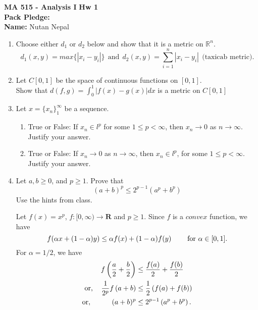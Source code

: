 \documentclass[12pt]{article}
\newcommand{\ds}{\displaystyle}
\begin{document}
{\large \textbf{MA 515 - Analysis I}}\hfill
\textbf{Hw 1} \\
{\bf Pack Pledge:} \\
{\bf Name:} Nutan Nepal\hfill \\
 \underline{}\hrulefill
\vspace{.1in}

\begin{enumerate}

\item Choose either $d_1$ or $d_2$ below and show that it is a metric on $\mathbb{R}^n$. 
 $$d_1(x,y) = max\{|x_i-y_i|\} \ \ \text{and} \ \ d_2(x,y) = \sum_{i=1}^n |x_i - y_i| \ \ \text{(taxicab metric)}.$$
 \begin{mybox}
  
 \end{mybox}
 \item Let $C[0,1]$ be the space of continuous functions on $[0,1]$. \\
 Show that $\ds d(f,g) = \int_0^1|f(x) - g(x)| dx$ is a metric on $C[0,1]$
 
  
\item   Let $x = \{x_n\}_1^{\infty}$ be a sequence. 
\begin{enumerate} 
\item True or False: If $x_n \in l^p$ for some $1 \leq p < \infty$, then  $x_n \to 0$ as $n \to \infty$. Justify your answer.
\item True or False: If $x_n \to 0$ as $n \to \infty$, then $x_n \in l^p$, for some $1 \leq p < \infty$. Justify your answer.
 \end{enumerate}
 
 
 \item Let $a, b \geq 0$, and $p \geq 1$. Prove that 
 $$(a+b)^p \leq 2^{p-1} (a^p + b^p)$$
  Use the hints from class.

\begin{mybox}

  Let $f(x)=x^p$, $f:[0, \infty)\to \mathbf{R}$ and
    $p\geq 1$. Since $f$ is a $convex$ function, we have
    $$f(\alpha x +(1-\alpha)y)\leq\alpha f(x)+(1-\alpha)
    f(y)\hspace{8mm}\text{for } \alpha\in [0,1].$$
    For $\alpha=1/2$, we have
    \begin{align*}
        f\left(\frac{a}{2}+\frac{b}{2}\right)
        &\leq \frac{f(a)}{2}+\frac{f(b)}{2}\\
        \text{or, }\hspace{3mm}
        \frac{1}{2^p}f\left(a+b\right)
        &\leq \frac{1}{2}\left(f(a)+f(b)\right)\\
        \text{or, }\hspace{9.5mm} (a+b)^p
        &\leq 2^{p-1}\left(a^p+b^p\right).
    \end{align*}
  \end{mybox}


\end{enumerate}
\end{document}

